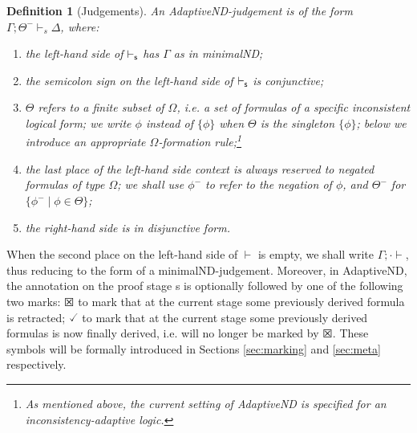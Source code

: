 \documentclass[]{article}
\newtheorem{definition}{Definition}
\begin{document}
\begin{definition}[Judgements]
An {\sf AdaptiveND}-judgement is of the form $\Gamma; \Theta^{-}\vdash_{s} \Delta$, where: 

\begin{enumerate}
\item the left-hand side of $\vdash_{\sf s}$ has $\Gamma$ as in {\sf minimalND};
\item the semicolon sign on the left-hand side of $\vdash_{\sf s}$ is conjunctive;
\item $\Theta$ refers to a finite subset of $\Omega$, i.e. a set of formulas of a specific inconsistent logical form; we write $\phi$ instead of $\{\phi\}$ when $\Theta$ is the singleton $\{\phi\}$; below we introduce an appropriate $\Omega$-formation rule;\footnote{As mentioned above, the current setting of {\sf AdaptiveND} is specified for an inconsistency-adaptive logic.}
\item the last place of the left-hand side context is always reserved to negated formulas of type $\Omega$; we shall use $\phi^{-}$ to refer to the negation of $\phi$, and $\Theta^-$ for $\{\phi^- \mid \phi \in \Theta\}$;
\item the right-hand side is in disjunctive form.
\end{enumerate}
\end{definition}
%
When the second place on the left-hand side of $\vdash$ is empty, we shall write $\Gamma;\cdot\vdash$, thus reducing to the form of a {\sf minimalND}-judgement. 
Moreover, in {\sf AdaptiveND}, the annotation on the proof stage {\sf s} is optionally followed by one of the following two marks: $\XBox$ to mark that at the current stage some previously derived formula is retracted; $\checked$ to mark that at the current stage some previously derived formulas is now finally derived, i.e. will no longer be marked by $\XBox$. These symbols will be formally introduced in Sections \ref{sec:marking} and \ref{sec:meta} respectively. 
\end{document}
